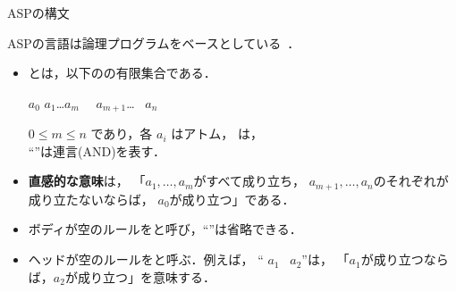 \documentclass[dvipdfmx, 11pt]{beamer}
\begin{document}
\begin{frame}{ASPの構文}
  \begin{alertblock}{}\centering
    ASPの言語は論理プログラムをベースとしている~\footnotemark．
  \end{alertblock}
  \begin{itemize}
  \item {}とは，以下のの有限集合である．
    \begin{center}
      \begin{minipage}[c]{0.7\textwidth}
        \begin{block}{}\centering
          $a_0$\quad\code{:-} \quad$a_1$\code{,}\ldots\code{,}$a_m$\code{,}
          \ ~$a_{m+1}$\code{,}\ldots\code{,} ~$a_n$
        \end{block}        
      \end{minipage}
   \end{center}\vfill
    $0 \leq m \leq n$ であり，各 $a_i$ はアトム，
    は，\\
    ``\code{,}''は連言(AND)を表す．
  \item \alert{\bf 直感的な意味}は，
    「$a_1,\ldots,a_m$がすべて成り立ち，
    $a_{m+1},\ldots,a_n$のそれぞれが成り立たないならば，
    $a_0$が成り立つ」である．
  \item ボディが空のルールをと呼び，``\code{:-}''は省略できる．
  \item ヘッドが空のルールをと呼ぶ．例えば，
    ``\code{:-} $a_1$\code{,} ~$a_{2}$''は，
    「$a_1$が成り立つならば，$a_2$が成り立つ」を意味する．
  \end{itemize}
\end{frame}
\end{document}
